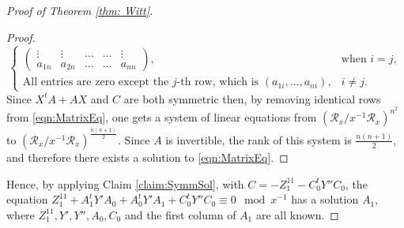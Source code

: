 \documentclass[11pt,a4paper,reqno]{amsart}
\theoremstyle{definition}
\theoremstyle{remark}
\numberwithin{equation}{section}
\begin{document}
\begin{proof}[Proof of Theorem \ref{thm: Witt}]
\begin{proof}
\begin{equation}
\begin{cases}
\begin{pmatrix}
                \vdots&\vdots&\dots&\dots&\vdots\\
                a_{1n}&a_{2n}&\dots&\dots&a_{nn}
            \end{pmatrix},& \text{when } i=j,\\
            \text{All entries are zero except the }j\text{-th row, which is } (a_{1i},\dots,a_{ni}),&i\neq j.
        \end{cases}
    \end{equation}
    Since $X^tA+AX$ and $C$ are both symmetric then, by removing identical rows from \eqref{eqn:MatrixEq}, one gets a system of linear equations from $(\mathcal{R}_x/x^{-1}\mathcal{R}_x)^{n^2}$ to $(\mathcal{R}_x/x^{-1}\mathcal{R}_x)^{\frac{n(n+1)}{2}}$. Since $A$ is invertible, the rank of this system is $\frac{n(n+1)}{2}$, and therefore there exists a solution to \eqref{eqn:MatrixEq}. 
\end{proof}
    Hence, by applying Claim \ref{claim:SymmSol}, with $C=-Z_1^{11}-C_0^tY''C_0$, the equation $Z_1^{11}+A_1^tY'A_0+A_0^tY'A_1+C_0^tY''C_0\equiv 0\mod x^{-1}$ has a solution $A_1$, where $Z_{1}^{11},Y',Y'',A_0,C_0$ and the first column of $A_1$ are all known. 

\end{proof}
\end{document}
